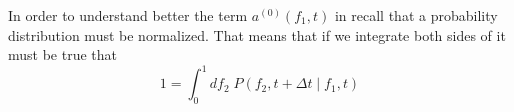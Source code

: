 In order to understand better the term $a^{(0)}(f_1, t)$ in
 recall that a probability distribution must be
normalized. That means that if we integrate both sides of
 it must be true that
\begin{equation}
  1 = \int_0^1 df_2 \; P(f_2, t + \Delta t \mid f_1, t)
\end{equation}
